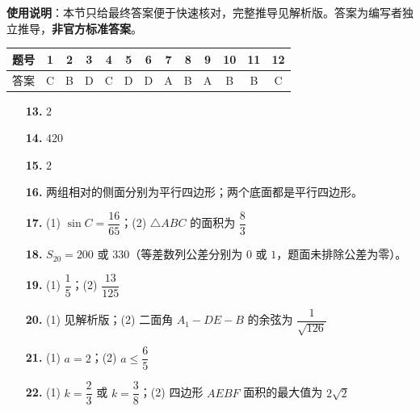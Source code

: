 
\begin{gknotice}
\textbf{使用说明}：本节只给最终答案便于快速核对，完整推导见解析版。答案为编写者独立推导，\textbf{非官方标准答案}。
\end{gknotice}

\begin{center}\begin{tabular}{ccccccccccccc}
\toprule
题号 & 1 & 2 & 3 & 4 & 5 & 6 & 7 & 8 & 9 & 10 & 11 & 12 \\
\midrule
答案 & C & B & D & C & D & D & A & B & A & B & B & C \\
\bottomrule
\end{tabular}\end{center}

\begin{itemize}[leftmargin=2.6em]
  \item[\textbf{13.}] $2$
  \item[\textbf{14.}] $420$
  \item[\textbf{15.}] $2$
  \item[\textbf{16.}] 两组相对的侧面分别为平行四边形；两个底面都是平行四边形。
\end{itemize}

\begin{itemize}[leftmargin=2.6em]
  \item[\textbf{17.}] (1) $\sin C=\dfrac{16}{65}$；(2) $\triangle ABC$ 的面积为 $\dfrac83$
  \item[\textbf{18.}] $S_{20}=200$ 或 $330$（等差数列公差分别为 $0$ 或 $1$，题面未排除公差为零）。
  \item[\textbf{19.}] (1) $\dfrac15$；(2) $\dfrac{13}{125}$
  \item[\textbf{20.}] (1) 见解析版；(2) 二面角 $A_1-DE-B$ 的余弦为 $\dfrac1{\sqrt{126}}$
  \item[\textbf{21.}] (1) $a=2$；(2) $a\leqslant\dfrac65$
  \item[\textbf{22.}] (1) $k=\dfrac23$ 或 $k=\dfrac38$；(2) 四边形 $AEBF$ 面积的最大值为 $2\sqrt2$
\end{itemize}
